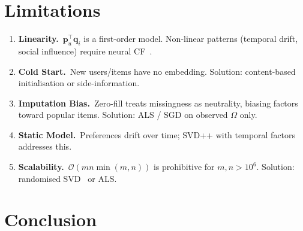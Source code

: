 \documentclass[12pt, a4paper]{article}
\newcommand{\Om}{\Omega}
\begin{document}
\section{Limitations}
\label{sec:limit}

\begin{enumerate}
  \item \textbf{Linearity.}\ $\mathbf{p}_u^\top\mathbf{q}_i$ is a
        first-order model.  Non-linear patterns (temporal drift,
        social influence) require neural CF~\citep{he2017neural}.

  \item \textbf{Cold Start.}\ New users/items have no embedding.
        Solution: content-based initialisation or side-information.

  \item \textbf{Imputation Bias.}\ Zero-fill treats missingness as
        neutrality, biasing factors toward popular items.
        Solution: ALS / SGD on observed $\Om$ only.

  \item \textbf{Static Model.}\ Preferences drift over time;
        SVD++ with temporal factors~\citep{koren2010collaborative}
        addresses this.

  \item \textbf{Scalability.}\ $\mathcal{O}(mn\min(m,n))$ is
        prohibitive for $m,n > 10^6$.
        Solution: randomised SVD~\citep{halko2011finding} or ALS.
\end{enumerate}

\section{Conclusion}
\label{sec:conc}
\end{document}
